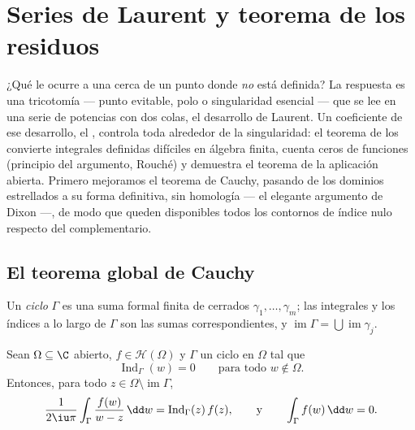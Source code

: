 \chapter{Series de Laurent y teorema de los residuos}
\label{ch:b3:residues}

¿Qué le ocurre a una 
cerca de un punto donde \emph{no} está definida? La respuesta es una
tricotomía  --- punto
evitable, polo o singularidad esencial --- que se lee en una serie de
potencias con dos colas, el desarrollo de Laurent. Un coeficiente de ese
desarrollo, el \emph{},
controla toda 
alrededor de la singularidad: el teorema de los
 convierte integrales
definidas difíciles en álgebra finita, cuenta ceros de funciones
(principio del argumento, Rouché) y demuestra el teorema de la
aplicación abierta. Primero mejoramos el teorema de Cauchy, pasando de
los dominios estrellados a su forma definitiva, sin homología --- el
elegante argumento de Dixon ---, de modo que queden disponibles todos
los contornos de índice nulo respecto del complementario.

\section{El teorema global de Cauchy}

Un \emph{ciclo} $\Gamma$ es una suma formal finita de
 cerrados
$\gamma_1, \dots, \gamma_m$; las integrales y los índices a lo largo de
$\Gamma$ son las sumas correspondientes, y
$\operatorname{im}\Gamma = \bigcup\operatorname{im}\gamma_j$.

\begin{theorem}
\label{thm:b3:residues:globalcauchy}
Sean $\Omega \subseteq \C$ abierto, $f \in \mathcal H(\Omega)$ y
$\Gamma$ un ciclo en $\Omega$ tal que
\[
\operatorname{Ind}_\Gamma(w) = 0
\qquad\text{para todo } w \notin \Omega .
\]
Entonces, para todo $z \in \Omega\setminus\operatorname{im}\Gamma$,
\[
\frac1{2\iu\pi}\int_\Gamma\frac{f(w)}{w - z}\,\dd w =
\operatorname{Ind}_\Gamma(z)\,f(z),
\qquad\text{y}\qquad
\int_\Gamma f(w)\,\dd w = 0 .
\]
\end{theorem}

